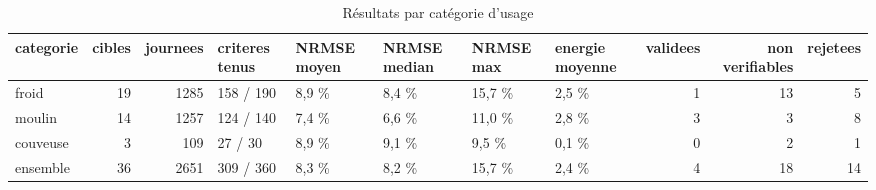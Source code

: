 \begin{table}[htbp]
\caption{Résultats par catégorie d'usage}
\label{tab:resultats_par_categorie}
\begin{tabular}{lrrlllllrrr}
\toprule
categorie & cibles & journees & criteres tenus & NRMSE moyen & NRMSE median & NRMSE max & energie moyenne & validees & non verifiables & rejetees \\
\midrule
froid & 19 & 1285 & 158 / 190 & 8,9 \% & 8,4 \% & 15,7 \% & 2,5 \% & 1 & 13 & 5 \\
moulin & 14 & 1257 & 124 / 140 & 7,4 \% & 6,6 \% & 11,0 \% & 2,8 \% & 3 & 3 & 8 \\
couveuse & 3 & 109 & 27 / 30 & 8,9 \% & 9,1 \% & 9,5 \% & 0,1 \% & 0 & 2 & 1 \\
ensemble & 36 & 2651 & 309 / 360 & 8,3 \% & 8,2 \% & 15,7 \% & 2,4 \% & 4 & 18 & 14 \\
\bottomrule
\end{tabular}
\end{table}
